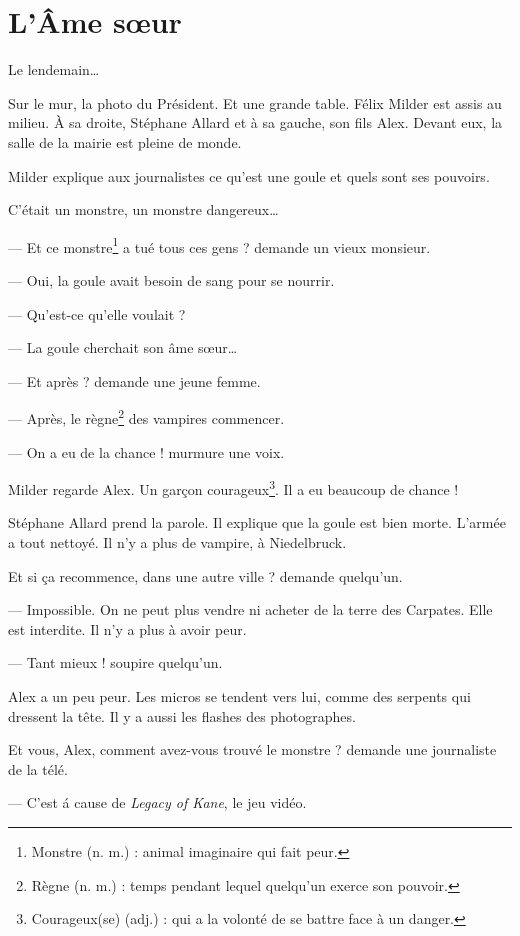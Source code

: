 \chapter{L'Âme s\oe{}ur}
Le lendemain\ldots{}

Sur le mur, la photo du Président. Et une grande table. Félix Milder est assis au milieu. À sa droite, Stéphane Allard et à sa
gauche, son fils Alex. Devant eux, la salle de la mairie est pleine de monde.

Milder explique aux journalistes ce qu'est une goule et quels sont ses pouvoirs.

\og C'était un monstre, un monstre dangereux\ldots{}

--- Et ce monstre\footnote{Monstre (n. m.) : animal imaginaire qui fait peur.} a tué tous ces gens ? demande un vieux monsieur.

--- Oui, la goule avait besoin de sang pour se nourrir.

--- Qu'est-ce qu'elle voulait ?

--- La goule cherchait son âme s\oe{}ur\ldots{}

--- Et après ? demande une jeune femme.

--- Après, le règne\footnote{Règne (n. m.) : temps pendant lequel quelqu'un exerce son pouvoir.} des vampires commencer.

--- On a eu de la chance ! \fg{} murmure une voix.

Milder regarde Alex. Un gar\c{c}on courageux\footnote{Courageux(se) (adj.) : qui a la volonté de se battre face à un danger.}. Il
a eu beaucoup de chance !

Stéphane Allard prend la parole. Il explique que la goule est bien morte. L'armée a tout nettoyé. Il n'y a plus de vampire, à
Niedelbruck.

\og Et si \c{c}a recommence, dans une autre ville ? demande quelqu'un.

--- Impossible. On ne peut plus vendre ni acheter de la terre des Carpates. Elle est interdite. Il n'y a plus à avoir peur.

--- Tant mieux ! \fg{} soupire quelqu'un.

Alex a un peu peur. Les micros se tendent vers lui, comme des serpents qui dressent la tête. Il y a aussi les flashes des
photographes.

\og Et vous, Alex, comment avez-vous trouvé le monstre ? demande une journaliste de la télé.

--- C'est á cause de \emph{Legacy of Kane}, le jeu vidéo.

